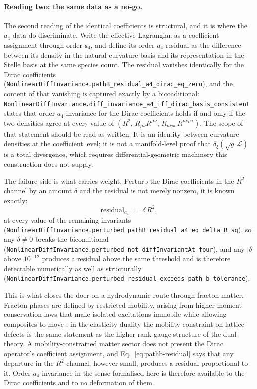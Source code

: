 \documentclass[aps,prd,nofootinbib,superscriptaddress,12pt]{revtex4-2}
\DeclareRobustCommand{\lb}{\discretionary{}{}{}}
\begin{document}
\paragraph{Reading two: the same data as a no-go.}
The second reading of the identical coefficients is structural, and it is where
the $a_4$ data do discriminate. Write the effective Lagrangian as a coefficient
assignment through order $a_4$, and define its order-$a_4$ residual as the
difference between its density in the natural curvature basis and its
representation in the Stelle basis at the same species count. The residual
vanishes identically for the Dirac coefficients
(\texttt{Nonlinear\lb{}Diff\lb{}Invariance.\lb{}path\lb{}B\_\lb{}residual\_\lb{}a4\_\lb{}dirac\_\lb{}eq\_\lb{}zero}), and the
content of that vanishing is captured exactly by a biconditional:
\texttt{Nonlinear\lb{}Diff\lb{}Invariance.\lb{}diff\_\lb{}invariance\_\lb{}a4\_\lb{}iff\_\lb{}dirac\_\lb{}basis\_\lb{}consistent}
states that order-$a_4$ invariance for the Dirac coefficients holds if and only
if the two densities agree at every value of $(R^2,\,R_{\mu\nu}R^{\mu\nu},\,
R_{\mu\nu\rho\sigma}R^{\mu\nu\rho\sigma})$. The scope of that statement should
be read as written. It is an identity between curvature densities at the
coefficient level; it is not a manifold-level proof that
$\delta_\xi(\sqrt{g}\,\mathcal L)$ is a total divergence, which requires
differential-geometric machinery this construction does not supply.

The failure side is what carries weight. Perturb the Dirac coefficients in the
$R^2$ channel by an amount $\delta$ and the residual is not merely nonzero, it
is known exactly:
\begin{equation}
\label{eq:pathb-residual}
\text{residual}_{a_4} \;=\; \delta\, R^2 ,
\end{equation}
at every value of the remaining invariants
(\texttt{Nonlinear\lb{}Diff\lb{}Invariance.\lb{}perturbed\_\lb{}path\lb{}B\_\lb{}residual\_\lb{}a4\_\lb{}eq\_\lb{}delta\_\lb{}R\_\lb{}sq}),
so any $\delta \neq 0$ breaks the biconditional
(\texttt{Nonlinear\lb{}Diff\lb{}Invariance.\lb{}perturbed\_\lb{}not\_\lb{}diff\lb{}Invariant\lb{}At\_\lb{}four}), and any
$|\delta|$ above $10^{-12}$ produces a residual above the same threshold and is
therefore detectable numerically as well as structurally
(\texttt{Nonlinear\lb{}Diff\lb{}Invariance.\lb{}perturbed\_\lb{}residual\_\lb{}exceeds\_\lb{}path\_\lb{}b\_\lb{}tolerance}).

This is what closes the door on a hydrodynamic route through fracton matter.
Fracton phases are defined by restricted mobility, arising from
higher-moment conservation laws that make isolated excitations immobile while
allowing composites to move \cite{PretkoRadzihovsky2018}; in the elasticity
duality the mobility constraint on lattice defects is the same statement as the
higher-rank gauge structure of the dual theory. A mobility-constrained matter
sector does not present the Dirac operator's coefficient assignment, and
Eq.~\eqref{eq:pathb-residual} says that any departure in the $R^2$ channel,
however small, produces a residual proportional to it. Order-$a_4$ invariance in
the sense formalised here is therefore available to the Dirac coefficients and
to no deformation of them.
\end{document}
